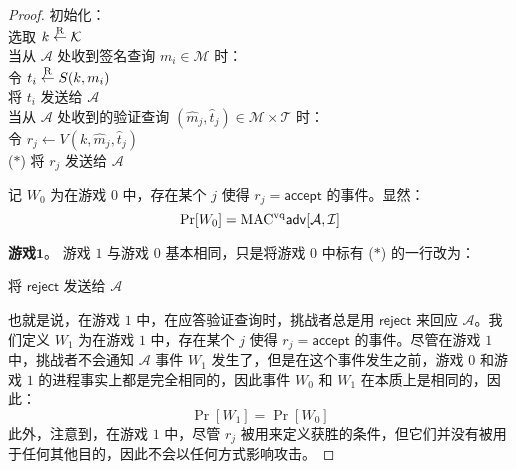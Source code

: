 \begin{proof}
\hspace*{5pt} 初始化：\\
\hspace*{50pt} 选取 $k\overset{\rm R}\leftarrow\mathcal{K}$\\
\hspace*{26pt} 当从 $\mathcal{A}$ 处收到签名查询 $m_i\in\mathcal{M}$ 时：\\
\hspace*{50pt} 令 $t_i\overset{\rm R}\leftarrow S(k,m_i)$\\
\hspace*{50pt} 将 $t_i$ 发送给 $\mathcal{A}$\\
\hspace*{26pt} 当从 $\mathcal{A}$ 处收到的验证查询 $(\hat m_j,\hat t_j)\in\mathcal{M}\times\mathcal{T}$ 时：\\
\hspace*{50pt} 令 $r_j\leftarrow V(k,\hat m_j,\hat t_j)$\\
\hspace*{10pt} ($*$)
\hspace*{19.5pt} 将 $r_j$ 发送给 $\mathcal{A}$

\vspace{5pt}


记 $W_0$ 为在游戏 $0$ 中，存在某个 $j$ 使得 $r_j=\mathsf{accept}$ 的事件。显然：
\begin{equation}\label{eq:6-1}
\Pr[W_0]={\rm MAC^{vq}}\mathsf{adv}[\mathcal{A},\mathcal{I}]
\end{equation}

\noindent\textbf{游戏$\mathbf{1}$}。
游戏 $1$ 与游戏 $0$ 基本相同，只是将游戏 $0$ 中标有 ($*$) 的一行改为：

\vspace{5pt}

\hspace*{50pt} 将 $\mathsf{reject}$ 发送给 $\mathcal{A}$

\vspace{5pt}

也就是说，在游戏 $1$ 中，在应答验证查询时，挑战者总是用 $\mathsf{reject}$ 来回应 $\mathcal{A}$。我们定义 $W_1$ 为在游戏 $1$ 中，存在某个 $j$ 使得 $r_j=\mathsf{accept}$ 的事件。尽管在游戏 $1$ 中，挑战者不会通知 $\mathcal{A}$ 事件 $W_1$ 发生了，但是在这个事件发生之前，游戏 $0$ 和游戏 $1$ 的进程事实上都是完全相同的，因此事件 $W_0$ 和 $W_1$ 在本质上是相同的，因此：
\begin{equation}\label{eq:6-2}
\Pr[W_1]=\Pr[W_0]
\end{equation}
此外，注意到，在游戏 $1$ 中，尽管 $r_j$ 被用来定义获胜的条件，但它们并没有被用于任何其他目的，因此不会以任何方式影响攻击。


\end{proof}

